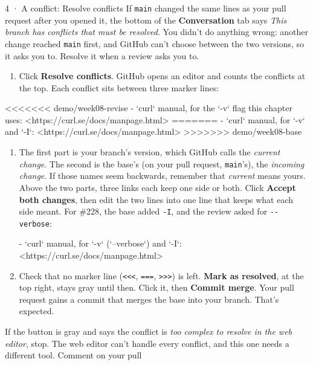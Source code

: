 \documentclass{handout}
\begin{document}
\begin{frame}{4 · A conflict: Resolve conflicts}
  If \texttt{main} changed the same lines as your pull request after you
  opened it, the bottom of the \textbf{Conversation} tab says \textit{This
  branch has conflicts that must be resolved}. You didn't do anything
  wrong: another change reached \texttt{main} first, and GitHub can't
  choose between the two versions, so it asks you to. Resolve it when a
  review asks you to.
  \begin{enumerate}
    \item Click \textbf{Resolve conflicts}. GitHub opens an editor and
      counts the conflicts at the top. Each conflict sits between three
      marker lines:
  \end{enumerate}
\begin{plain}
<<<<<<< demo/week08-revise
- `curl` manual, for the `-v` flag this chapter uses: <https://curl.se/docs/manpage.html>
=======
- `curl` manual, for `-v` and `-I`: <https://curl.se/docs/manpage.html>
>>>>>>> demo/week08-base
\end{plain}
  \begin{enumerate}[resume]
    \item The first part is your branch's version, which GitHub calls the
      \textit{current change}. The second is the base's (on your pull
      request, \texttt{main}'s), the \textit{incoming change}. If those
      names seem backwards, remember that \textit{current} means yours. Above
      the two parts, three links each keep one side or both. Click
      \textbf{Accept both changes}, then edit the two lines into one line
      that keeps what each side meant. For \#228, the base added
      \texttt{-I}, and the review asked for \texttt{-{}-verbose}:
\begin{plain}
- `curl` manual, for `-v` (`--verbose`) and `-I`: <https://curl.se/docs/manpage.html>
\end{plain}
    \item Check that no marker line (\texttt{<{}<{}<}, \texttt{===},
      \texttt{>{}>{}>}) is left. \textbf{Mark as resolved}, at the top
      right, stays gray until then. Click it, then \textbf{Commit merge}.
      Your pull request gains a commit that merges the base into your
      branch. That's expected.
  \end{enumerate}
  If the button is gray and says the conflict is \textit{too complex to
  resolve in the web editor}, stop. The web editor can't handle every
  conflict, and this one needs a different tool. Comment on your pull

\end{frame}
\end{document}

